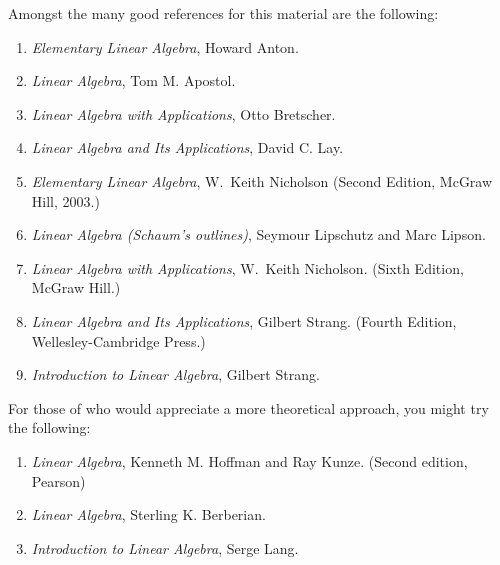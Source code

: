 
Amongst the many good references for this material are the following:

\medskip

\begin{enumerate}[]
\item {\it Elementary Linear Algebra}, Howard Anton.
 \smallskip

\item {\it  Linear Algebra}, Tom M. Apostol.
 \smallskip
 \item {\it Linear Algebra with Applications}, Otto Bretscher. 
\smallskip
\item {\it Linear Algebra and Its Applications}, David C. Lay.
 \smallskip
 \item {\it Elementary Linear Algebra}, W.~Keith Nicholson (Second Edition, McGraw Hill, 2003.)
\smallskip

 \item {\it Linear Algebra (Schaum's outlines)}, Seymour Lipschutz and Marc Lipson.
\smallskip
 \item {\it Linear Algebra with Applications}, W.~Keith Nicholson. (Sixth Edition, McGraw Hill.)
\smallskip
 \item {\it Linear Algebra and Its Applications}, Gilbert Strang. (Fourth Edition, Wellesley-Cambridge Press.)
\smallskip
\item {\it Introduction to Linear Algebra}, Gilbert Strang.


\end{enumerate}

\bigskip


For those of who would appreciate a more theoretical approach, you might try the following:

\medskip

\begin{enumerate}[]
\item {\it Linear Algebra}, Kenneth M. Hoffman and Ray Kunze. (Second edition, Pearson)
 \smallskip
 \item {\it Linear Algebra}, Sterling K. Berberian. 
\smallskip
 \item {\it Introduction to Linear Algebra}, Serge Lang.


\end{enumerate}
